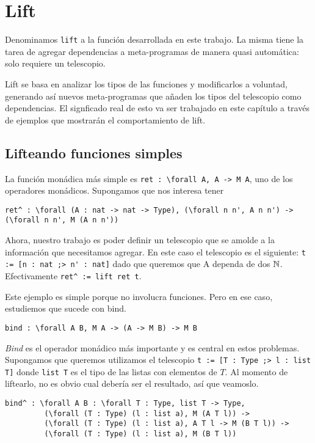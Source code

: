 \section{Lift}

Denominamos \lstinline{lift} a la función desarrollada en este trabajo.
La misma tiene la tarea de agregar dependencias a meta-programas de manera quasi automática: solo requiere un
telescopio.

Lift se basa en analizar los tipos de las funciones y modificarlos a voluntad, generando así nuevos meta-programas que
añaden los tipos del telescopio como dependencias. El signficado real de esto va ser trabajado en este capítulo a través
de ejemplos que mostrarán el comportamiento de lift.

\subsection[]{Lifteando funciones simples} 

La función monádica más simple es \lstinline{ret : \forall A, A -> M A}, uno de los operadores monádicos. Supongamos que
nos interesa tener
\begin{lstlisting}
ret^ : \forall (A : nat -> nat -> Type), (\forall n n', A n n') -> (\forall n n', M (A n n'))
\end{lstlisting}
Ahora, nuestro trabajo es poder definir un telescopio que se amolde a la información que necesitamos agregar. En este
caso el telescopio es el siguiente: \lstinline{t := [n : nat ;> n' : nat]} dado que queremos que \lstinline{}{A} dependa
de dos $\mathbb{N}$. Efectivamente \lstinline{ret^ := lift ret t}.

Este ejemplo es simple porque no involucra funciones. Pero en ese caso, estudiemos que sucede con bind.
\begin{lstlisting}
bind : \forall A B, M A -> (A -> M B) -> M B
\end{lstlisting}

\textit{Bind} es el operador monádico más importante y es central en estos problemas.
Supongamos que queremos utilizamos el telescopio \lstinline{t := [T : Type ;> l : list T]} donde \lstinline{list T} es
el tipo de las listas con elementos de $T$. Al momento de liftearlo, no es obvio cual debería ser el resultado, así que
veamoslo.

\begin{lstlisting}
bind^ : \forall A B : \forall T : Type, list T -> Type,
         (\forall (T : Type) (l : list a), M (A T l)) ->
         (\forall (T : Type) (l : list a), A T l -> M (B T l)) ->
         (\forall (T : Type) (l : list a), M (B T l))
\end{lstlisting}

